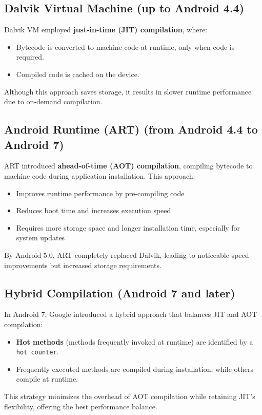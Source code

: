 \documentclass{article}
\begin{document}
\subsection{Dalvik Virtual Machine (up to Android 4.4)}
Dalvik VM employed \textbf{just-in-time (JIT) compilation}, where:
\begin{itemize}
    \item Bytecode is converted to machine code at runtime, only when code is required.
    \item Compiled code is cached on the device.
\end{itemize}
Although this approach saves storage, it results in slower runtime performance due to on-demand compilation.

\subsection{Android Runtime (ART) (from Android 4.4 to Android 7)}
ART introduced \textbf{ahead-of-time (AOT) compilation}, compiling bytecode to machine code during application installation. This approach:
\begin{itemize}
    \item Improves runtime performance by pre-compiling code
    \item Reduces boot time and increases execution speed
    \item Requires more storage space and longer installation time, especially for system updates
\end{itemize}
By Android 5.0, ART completely replaced Dalvik, leading to noticeable speed improvements but increased storage requirements.

\subsection{Hybrid Compilation (Android 7 and later)}
In Android 7, Google introduced a hybrid approach that balances JIT and AOT compilation:
\begin{itemize}
    \item \textbf{Hot methods} (methods frequently invoked at runtime) are identified by a \texttt{hot counter}.
    \item Frequently executed methods are compiled during installation, while others compile at runtime.
\end{itemize}
This strategy minimizes the overhead of AOT compilation while retaining JIT’s flexibility, offering the best performance balance.
\end{document}
